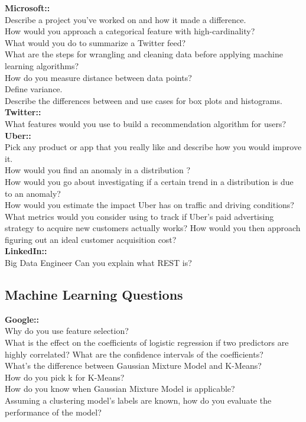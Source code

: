 \documentclass[11pt]{article}
\begin{document}
{\bf Microsoft:: } \\
Describe a project you’ve worked on and how it made a difference.\\
How would you approach a categorical feature with high-cardinality?\\
What would you do to summarize a Twitter feed?\\
What are the steps for wrangling and cleaning data before applying machine learning algorithms?\\
How do you measure distance between data points?\\
Define variance.\\
Describe the differences between and use cases for box plots and histograms.\\

{\bf Twitter:: }\\
What features would you use to build a recommendation algorithm for users?\\

{\bf Uber:: }\\
Pick any product or app that you really like and describe how you would improve it.\\
How would you find an anomaly in a distribution ?\\
How would you go about investigating if a certain trend in a distribution is due to an anomaly?\\
How would you estimate the impact Uber has on traffic and driving conditions?\\
What metrics would you consider using to track if Uber’s paid advertising strategy to acquire new customers actually works? How would you then approach figuring out an ideal customer acquisition cost?\\

{\bf LinkedIn::} \\
Big Data Engineer Can you explain what REST is?\\


\subsection{Machine Learning Questions}
{\bf Google:: }\\
Why do you use feature selection?\\
What is the effect on the coefficients of logistic regression if two predictors are highly correlated? What are the confidence intervals of the coefficients?\\
What’s the difference between Gaussian Mixture Model and K-Means?\\
How do you pick k for K-Means?\\
How do you know when Gaussian Mixture Model is applicable?\\
Assuming a clustering model’s labels are known, how do you evaluate the performance of the model?\\
\end{document}
